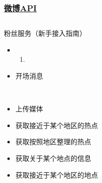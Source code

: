 \documentclass[../Postbot.tex]{subfiles}
\begin{document}
	\begin{frame}
		\frametitle{\href{https://open.weibo.com/wiki/\%E5\%BE\%AE\%E5\%8D\%9AAPI}{微博API}}
		\begin{columns}
			\begin{column}{.9\textwidth}
				粉丝服务（新手接入指南）
				\begin{itemize}
					\item {
						
						\begin{enumerate}
							\item 
						\end{enumerate}
					}
					\item 开场消息
				\end{itemize}
				\hspace*{\fill} \\
				\begin{itemize}
					\item 上传媒体
					\item 获取接近于某个地区的热点
					\item 获取按照地区整理的热点
					\item 获取关于某个地点的信息
					\item 获取接近于某个地区的地点
				\end{itemize}
			\end{column}
			
		\end{columns}


	\end{frame}
\end{document}

